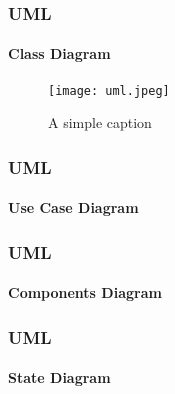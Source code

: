 \documentclass{beamer}
\begin{document}
\begin{frame}
 \frametitle{UML}
 \framesubtitle{Class Diagram}
  \begin{figure}[ht!]
  \centering
  \texttt{[image: uml.jpeg]}
  \caption{A simple caption}
  \label{overflow}
  \end{figure}
 
\end{frame}

\begin{frame}
 \frametitle{UML}
 \framesubtitle{Use Case Diagram}
  
\end{frame}

\begin{frame}
 \frametitle{UML}
 \framesubtitle{Components Diagram}

 
\end{frame}

\begin{frame}
 \frametitle{UML}
 \framesubtitle{State Diagram}

 
\end{frame}

%         


\end{document}

